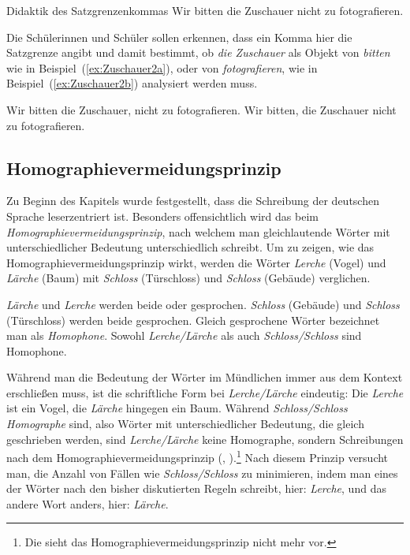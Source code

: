 \begin{Exkurs}{Didaktik des Satzgrenzenkommas}
\ea Wir bitten die Zuschauer nicht zu fotografieren. \label{ex:Zuschauer}
\z

Die Schülerinnen und Schüler sollen erkennen, dass ein Komma hier die Satzgrenze angibt und damit bestimmt, ob \textit{die Zuschauer} als Objekt von \textit{bitten} wie in Beispiel~(\ref{ex:Zuschauer2a}), oder von \textit{fotografieren}, wie in Beispiel~(\ref{ex:Zuschauer2b}) analysiert werden muss. 

\ea \label{ex:Zuschauer2}
\ea Wir bitten die Zuschauer, nicht zu fotografieren. \label{ex:Zuschauer2a}
\ex Wir bitten, die Zuschauer nicht zu fotografieren. \label{ex:Zuschauer2b}
\z
\z

\end{Exkurs}




\subsection{Homographievermeidungsprinzip}
\label{sec:Homographievermeidungsprinzip}

Zu Beginn des Kapitels wurde festgestellt, dass die Schreibung der deutschen Sprache leserzentriert ist. Besonders offensichtlich wird das beim \textit{Homographievermeidungsprinzip}, nach welchem man gleichlautende Wörter mit unterschiedlicher Bedeutung unterschiedlich schreibt. Um zu zeigen, wie das Homographievermeidungsprinzip wirkt, werden die Wörter \textit{Lerche} (Vogel) und \textit{Lärche} (Baum) mit \textit{Schloss} (Türschloss) und \textit{Schloss} (Gebäude) verglichen.

\textit{Lärche} und \textit{Lerche} werden beide \textipa{[\textprimstress lE5.ç@]} oder  gesprochen. \textit{Schloss} (Gebäude) und \textit{Schloss} (Türschloss) werden beide  gesprochen. Gleich gesprochene Wörter bezeichnet man als \textit{Homophone}. Sowohl \textit{Lerche/Lärche} als auch \textit{Schloss/Schloss} sind Homophone.

Während man die Bedeutung der Wörter im Mündlichen immer aus dem Kontext erschließen muss, ist die schriftliche Form bei \textit{Lerche/Lärche} eindeutig: Die \textit{Lerche} ist ein Vogel, die \textit{Lärche} hingegen ein Baum. Während \textit{Schloss/Schloss} \textit{Homographe} sind, also Wörter mit unterschiedlicher Bedeutung, die gleich geschrieben werden, sind \textit{Lerche/Lärche} keine Homographe, sondern Schreibungen nach dem Homographievermeidungsprinzip (\cite[242]{FuhrhopPeters2013}, \cite[83]{Duden2016}).\footnote{Die \citet{Duden2022} sieht das Homographievermeidungsprinzip nicht mehr vor.} Nach diesem Prinzip versucht man, die Anzahl von Fällen wie \textit{Schloss/Schloss} zu minimieren, indem man eines der Wörter nach den bisher diskutierten Regeln schreibt, hier: \textit{Lerche}, und das andere Wort anders, hier: \textit{Lärche}.


